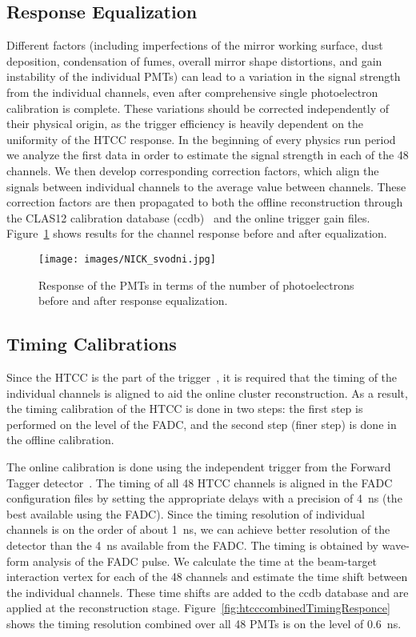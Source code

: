 \subsection{Response Equalization}

Different factors (including imperfections of the mirror working surface, dust deposition, condensation of fumes,
overall mirror shape distortions, and gain instability of the individual PMTs) can lead to a variation in the signal
strength from the individual channels, even after comprehensive single photoelectron calibration is complete.
These variations should be corrected independently of their physical origin, as the trigger efficiency is heavily
dependent on the uniformity of the HTCC response. In the beginning of every physics run period we analyze the
first data in order to estimate the signal strength in each of the 48 channels. We then develop corresponding
correction factors, which align the signals between individual channels to the average value between channels. These
correction factors are then propagated to both the offline reconstruction through the CLAS12 calibration database
(ccdb)~\cite{recon-nim} and the online trigger gain files. Figure~\ref{fig:NICK_svodni} shows results for the
channel response before and after equalization.

\begin{figure}[ht]
\centering
\texttt{[image: images/NICK\_svodni.jpg]}
\caption{Response of the PMTs in terms of the number of photoelectrons before and after response equalization.}
\label{fig:NICK_svodni}
\end{figure}

\subsection{Timing Calibrations}

Since the HTCC is the part of the trigger~\cite{trigger-nim}, it is required that the timing of the individual
channels is aligned to aid the online cluster reconstruction. As a result, the timing calibration of the HTCC is done
in two steps: the first step is performed on the level of the FADC, and the second step (finer step) is done in the
offline calibration.

The online calibration is done using the independent trigger from the Forward Tagger detector~\cite{ft-nim}. The
timing of all 48 HTCC channels is aligned in the FADC configuration files by setting the appropriate delays with a
precision of 4~ns (the best available using the FADC). Since the timing resolution of individual channels is on the
order of about 1~ns, we can achieve better resolution of the detector than the 4~ns available from the FADC. The timing is obtained by wave-form analysis of the FADC pulse. We calculate the time at the beam-target interaction vertex for each of the 48 channels and estimate the time
shift between the individual channels. These time shifts are added to the ccdb database and are applied at the
reconstruction stage. Figure~\ref{fig:htcccombinedTimingResponce} shows the timing resolution combined over all
48 PMTs is on the level of 0.6~ns.

